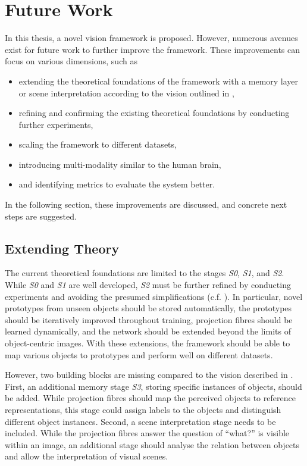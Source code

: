 \section{Future Work}
In this thesis, a novel vision framework is proposed. 
However, numerous avenues exist for future work to further improve the framework.
These improvements can focus on various dimensions, such as
\begin{itemize}
    \item extending the theoretical foundations of the framework with a memory layer or scene interpretation according to the vision outlined in ,
    \item refining and confirming the existing theoretical foundations by conducting further experiments,
    \item scaling the framework to different datasets,
    \item introducing multi-modality similar to the human brain,
    \item and identifying metrics to evaluate the system better.
\end{itemize}

In the following section, these improvements are discussed, and concrete next steps are suggested.

\subsection{Extending Theory}
The current theoretical foundations are limited to the stages \emph{S0}, \emph{S1}, and \emph{S2}.
While \emph{S0} and \emph{S1} are well developed, \emph{S2} must be further refined by conducting experiments and avoiding the presumed simplifications (c.f. ).
In particular, novel prototypes from unseen objects should be stored automatically, the prototypes should be iteratively improved throughout training, projection fibres should be learned dynamically, and the network should be extended beyond the limits of object-centric images.
With these extensions, the framework should be able to map various objects to prototypes and perform well on different datasets.

However, two building blocks are missing compared to the vision described in . First, an additional memory stage \emph{S3}, storing specific instances of objects, should be added. While projection fibres should map the perceived objects to reference representations, this stage could assign labels to the objects and distinguish different object instances.
Second, a scene interpretation stage needs to be included. While the projection fibres answer the question of ``what?'' is visible within an image, an additional stage should analyse the relation between objects and allow the interpretation of visual scenes.


